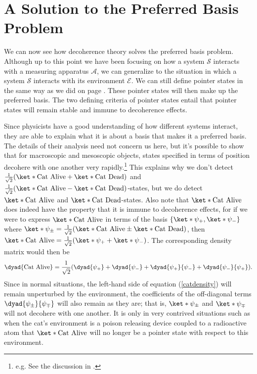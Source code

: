 \documentclass[12pt]{report}
\begin{document}

\section{\label{sectionPreferredBasis}A Solution to the Preferred Basis Problem\protect\footnotemark}
We can now see how decoherence theory solves the preferred basis problem. Although up to this point we have been focusing on how a system $\mathcal{S}$ interacts with a measuring apparatus $\mathcal{A}$, we can generalize to the situation in which a system $\mathcal{S}$ interacts with its environment $\mathcal{E}$. We can still define pointer states in the same way as we did on page \pageref{pointer}. These pointer states will then make up the preferred basis. The two defining criteria of pointer states entail that pointer states will remain stable and immune to decoherence effects. 

Since physicists have a good understanding of how different systems interact, they are able to explain what it is about a basis that makes it a preferred basis.  The details of their analysis need not concern us here, but it's possible to show that for macroscopic and mesoscopic objects, states specified in terms of position decohere with one another very rapidly.\footnote{e.g. See the discussion in \cite[94]{Schlosshauer}.} This explains why we don't detect $\frac{1}{\sqrt{2}}(\ket*{\text{Cat Alive}}+\ket*{\text{Cat Dead}})$ and $\frac{1}{\sqrt{2}}(\ket*{\text{Cat Alive}}-\ket*{\text{Cat Dead}})$-states, but we do detect $\ket*{\text{Cat Alive}}$ and $\ket*{\text{Cat Dead}}$-states. Also note that $\ket*{\text{Cat Alive}}$  does indeed have the property that it is immune to decoherence effects, for if we were to express $\ket*{\text{Cat Alive}}$ in terms of the basis $\{\ket*{\psi_+},\ket*{\psi_-} \}$ where $\ket*{\psi_\pm}=\frac{1}{\sqrt{2}}(\ket*{\text{Cat Alive}}\pm\ket*{\text{Cat Dead}})$, then $\ket*{\text{Cat Alive}}=\frac{1}{\sqrt{2}}(\ket*{\psi_+}+\ket*{\psi_-})$. The corresponding density matrix would then be 
\begin{equation}\label{catdensity}\dyad{\text{Cat Alive}}=\frac{1}{\sqrt{2}}(\dyad{\psi_+}+\dyad{\psi_-}+\dyad{\psi_+}{\psi_-}+\dyad{\psi_-}{\psi_+}). 
\end{equation} Since in normal situations, the left-hand side of equation (\ref{catdensity}) will remain unperturbed by the environment, the coefficients of the off-diagonal terms $\dyad{\psi_\pm}{\psi_\mp}$ will also remain as they are; that is, $\ket*{\psi_\pm}$ and $\ket*{\psi_\mp}$ will not decohere with one another. It is only in very contrived situations such as when the cat's environment is a poison releasing device coupled to a radioactive atom that $\ket*{\text{Cat Alive}}$ will no longer be a pointer state with respect to this environment.
\end{document}
